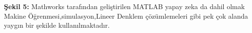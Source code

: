 \documentclass{IEEEtran}
\begin{document}
            \textbf{Şekil 5: }Mathworks tarafından geliştirilen MATLAB yapay zeka da dahil olmak Makine Öğrenmesi,simulasyon,Lineer Denklem çözümlemeleri gibi pek çok alanda yaygın bir şekilde kullanılmaktadır.



            
            

        
\end{document}
